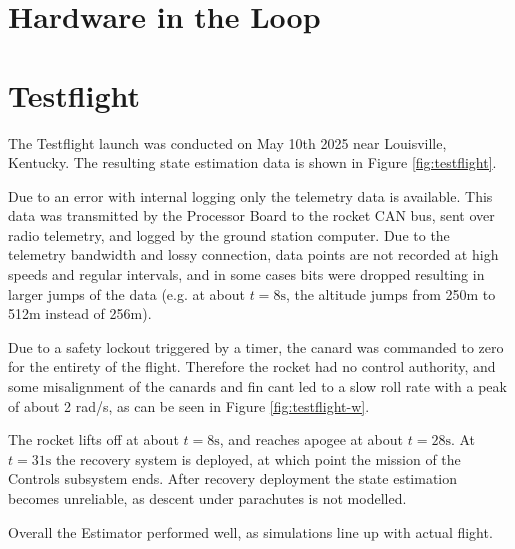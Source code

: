 \section{Hardware in the Loop}

\clearpage
\section{Testflight}
The Testflight launch was conducted on May 10th 2025 near Louisville, Kentucky.
The resulting state estimation data is shown in Figure \ref{fig:testflight}.

Due to an error with internal logging only the telemetry data is available. This data was transmitted by the Processor Board to the rocket CAN bus, sent over radio telemetry, and logged by the ground station computer.
Due to the telemetry bandwidth and lossy connection, data points are not recorded at high speeds and regular intervals, and in some cases bits were dropped resulting in larger jumps of the data (e.g. at about $t=8\mathrm{s}$, the altitude jumps from 250m to 512m instead of 256m).   

Due to a safety lockout triggered by a timer, the canard was commanded to zero for the entirety of the flight.
Therefore the rocket had no control authority, and some misalignment of the canards and fin cant led to a slow roll rate with a peak of about 2 rad/s, as can be seen in Figure \ref{fig:testflight-w}.

The rocket lifts off at about $t=8\mathrm{s}$, and reaches apogee at about $t=28\mathrm{s}$.
At $t=31\mathrm{s}$ the recovery system is deployed, at which point the mission of the Controls subsystem ends. 
After recovery deployment the state estimation becomes unreliable, as descent under parachutes is not modelled.

Overall the Estimator performed well, as simulations line up with actual flight. 

